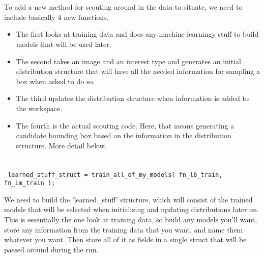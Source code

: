 \documentclass[11pt]{article}
\begin{document}
\title{}
\author{}
\date{}
\maketitle









\section*{}
To add a new method for scouting around in the data to situate, we need to include basically 4 new functions. 
\begin{itemize}
\item The first looks at training data and does any machine-learningy stuff to build models that will be used later. 
\item The second takes an image and an interest type and generates an initial distribution structure that will have all the needed information for sampling a box when asked to do so.
\item The third updates the distribution structure when information is added to the workspace.
\item The fourth is the actual scouting code. Here, that means generating a candidate bounding box based on the information in the distribution structure. More detail below.
\end{itemize}



\section{}

\verb| learned_stuff_struct = train_all_of_my_models( fn_lb_train, fn_im_train ); |

	We need to build the 'learned\_stuff' structure, which will consist of the trained models that will be selected when initializing and updating distributions later on. This is essentially the one look at training data, so build any models you'll want, store any information from the training data that you want, and name them whatever you want. Then store all of it as fields in a single struct that will be passed around during the run.
\end{document}
